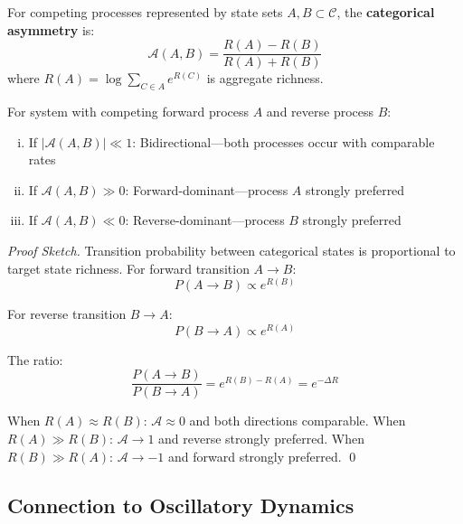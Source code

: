 \begin{definition}
\label{def:asymmetry}
For competing processes represented by state sets $A, B \subset \mathcal{C}$, the \textbf{categorical asymmetry} is:
\begin{equation}
\mathcal{A}(A, B) = \frac{R(A) - R(B)}{R(A) + R(B)}
\end{equation}
where $R(A) = \log \sum_{C \in A} e^{R(C)}$ is aggregate richness.
\end{definition}

\begin{theorem}
\label{thm:asymmetry_direction}
For system with competing forward process $A$ and reverse process $B$:
\begin{enumerate}[(i)]
\item If $|\mathcal{A}(A,B)| \ll 1$: Bidirectional—both processes occur with comparable rates
\item If $\mathcal{A}(A,B) \gg 0$: Forward-dominant—process $A$ strongly preferred
\item If $\mathcal{A}(A,B) \ll 0$: Reverse-dominant—process $B$ strongly preferred
\end{enumerate}
\end{theorem}

\begin{proof}[Proof Sketch]
Transition probability between categorical states is proportional to target state richness. For forward transition $A \to B$:
\begin{equation}
P(A \to B) \propto e^{R(B)}
\end{equation}

For reverse transition $B \to A$:
\begin{equation}
P(B \to A) \propto e^{R(A)}
\end{equation}

The ratio:
\begin{equation}
\frac{P(A \to B)}{P(B \to A)} = e^{R(B) - R(A)} = e^{-\Delta R}
\end{equation}

When $R(A) \approx R(B)$: $\mathcal{A} \approx 0$ and both directions comparable.
When $R(A) \gg R(B)$: $\mathcal{A} \to 1$ and reverse strongly preferred.
When $R(B) \gg R(A)$: $\mathcal{A} \to -1$ and forward strongly preferred. \qed
\end{proof}

\subsection{Connection to Oscillatory Dynamics}

